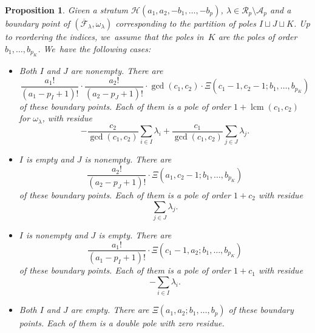 \documentclass[11pt]{article}
\DeclareMathOperator{\lcm}{lcm}
\newtheorem{prop}[thm]{Proposition}
\theoremstyle{definition}
\begin{document}
\begin{prop}\label{prop:flat-boundary}
Given a stratum $\mathcal{H}(a_{1},a_{2},-b_{1},\dots,-b_{p})$, $\lambda \in \mathcal{R}_{p} \setminus \mathcal{A}_{p}$ and a boundary point of $(\overline{\mathcal{F}}_{\lambda}, \omega_\lambda)$ corresponding to the partition of poles $I \sqcup J \sqcup K$. Up to reordering the indices, we~assume that the poles in~$K$ are the poles of order $b_{1},\ldots,b_{p_{K}}$. We~have the following cases:

\begin{itemize}
\item
\emph{Both $I$ and $J$ are nonempty.} There are
\begin{equation}\label{eq:numbnoempty}
\frac{a_{1}!}{(a_{1}-p_{I}+1)!} \cdot \frac{a_{2}!}{(a_{2}-p_{J}+1)!} \cdot \gcd (c_1, c_2) \cdot \Xi(c_{1}-1,c_{2}-1;b_{1},\dots,b_{p_{K}})
\end{equation}
of these boundary points. Each of them is a pole of order
$1 + \lcm (c_1, c_2)$
for $\omega_{\lambda}$, with residue
\begin{equation}\label{eq:resIJnonempty}
-\frac{c_{2}}{\gcd(c_{1},c_{2})}\sum_{i \in I} \lambda_{i} + \frac{c_{1}}{\gcd(c_{1},c_{2})}\sum_{j \in J} \lambda_{j}.
\end{equation}

\item
\emph{$I$ is empty and $J$ is nonempty.} There are
\begin{equation}
\frac{a_{2}!}{(a_{2}-p_{J}+1)!} \cdot \Xi(a_{1},c_{2}-1;b_{1},\dots,b_{p_{K}})
\end{equation}
of these boundary points. Each of them is a pole of order $1 + c_{2}$ with residue
\begin{equation}\label{eq:residuecase2}
\sum_{j \in J} \lambda_{j}.
\end{equation}

\item
\emph{$I$ is nonempty and $J$ is empty.} There are
\begin{equation}
\frac{a_{1}!}{(a_{1}-p_{I}+1)!} \cdot \Xi(c_{1}-1,a_{2};b_{1},\dots,b_{p_{K}})
\end{equation}
of these boundary points. Each of them is a pole of order $1 + c_{1}$ with residue
\begin{equation}
-\sum_{i \in I} \lambda_{i} .
\end{equation}

\item
\emph{Both $I$ and $J$ are empty.} There are $\Xi(a_{1},a_{2};b_{1},\dots,b_{p})$ of these boundary points. Each of them is a double pole with zero residue.
\end{itemize}
\end{prop}
\end{document}
